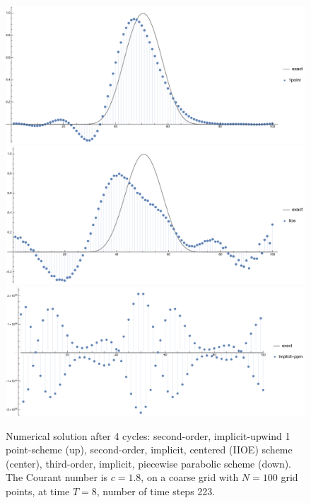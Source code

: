 \documentclass[../thesis.tex]{subfiles}
\begin{document}
\begin{figure}[H]
	\centering
	\includegraphics[width=\textwidth]{fig-1point-c1p8-T8-limit0-smooth.pdf}
	\includegraphics[width=\textwidth]{fig-iioe-c1p8-T8-limit0-smooth.pdf}
	\includegraphics[width=\textwidth]{fig-implicit-ppm-c1p8-T8-limit0-smooth.pdf}
	\caption{Numerical solution after 4 cycles: second-order, implicit-upwind 1 point-scheme (up), second-order, implicit, centered (IIOE) scheme (center), third-order, implicit, piecewise parabolic scheme (down). The Courant number is \(c = 1.8\), on a coarse grid with \(N = 100\) grid points, at time \(T = 8\), number of time steps 223.}
	\label{fig:c1p8-T8-limit0-smooth}
\end{figure}
\end{document}
